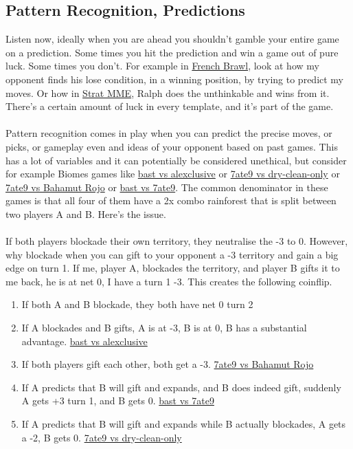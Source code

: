 \subsection{Pattern Recognition, Predictions}

Listen now, ideally when you are ahead you shouldn't gamble your entire game on a prediction. Some times you hit the prediction and win a game out of pure luck. Some times you don't. For example in \href{https://www.warzone.com/MultiPlayer?GameID=41449221}{French Brawl}, look at how my opponent finds his lose condition, in a winning position, by trying to predict my moves. Or how in \href{https://www.warzone.com/MultiPlayer?GameID=37546849}{Strat MME}, Ralph does the unthinkable and wins from it. There's a certain amount of luck in every template, and it's part of the game.
\\
\\
\label{gift_inss_predictions}
Pattern recognition comes in play when you can predict the precise moves, or picks, or gameplay even and ideas of your opponent based on past games. This has a lot of variables and it can potentially be considered unethical, but consider for example Biomes games like \href{https://www.warzone.com/MultiPlayer?GameID=40980127}{bast vs alexclusive} or \href{https://www.warzone.com/MultiPlayer?GameID=41003036}{7ate9 vs dry-clean-only} or \href{https://www.warzone.com/MultiPlayer?GameID=38437512}{7ate9 vs Bahamut Rojo} or \href{https://www.warzone.com/MultiPlayer?GameID=40607927}{bast vs 7ate9}. The common denominator in these games is that all four of them have a 2x combo rainforest that is split between two players A and B. Here's the issue.
\\
\\
If both players blockade their own territory, they neutralise the -3 to 0. However, why blockade when you can gift to your opponent a -3 territory and gain a big edge on turn 1. If me, player A, blockades the territory, and player B gifts it to me back, he is at net 0, I have a turn 1 -3. This creates the following coinflip.
\begin{enumerate}
    \item If both A and B blockade, they both have net 0 turn 2
    \item If A blockades and B gifts, A is at -3, B is at 0, B has a substantial advantage. \href{https://www.warzone.com/MultiPlayer?GameID=40980127}{bast vs alexclusive}
    \item If both players gift each other, both get a -3. \href{https://www.warzone.com/MultiPlayer?GameID=38437512}{7ate9 vs Bahamut Rojo}
    \item If A predicts that B will gift and expands, and B does indeed gift, suddenly A gets +3 turn 1, and B gets 0. \href{https://www.warzone.com/MultiPlayer?GameID=40607927}{bast vs 7ate9}
    \item If A predicts that B will gift and expands while B actually blockades, A gets a -2, B gets 0. \href{https://www.warzone.com/MultiPlayer?GameID=41003036}{7ate9 vs dry-clean-only}
\end{enumerate}
